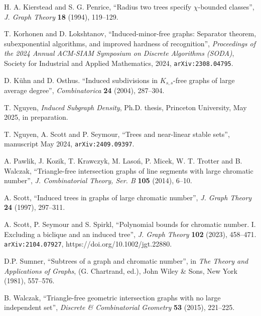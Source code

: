 \documentclass[titlepage,11pt]{article}
\begin{document}
\begin{thebibliography}{99}
 H. A. Kierstead and S. G. Penrice,
``Radius two trees specify $\chi$-bounded classes'',
{\em J. Graph Theory} {\bf 18} (1994), 119--129.

 T. Korhonen and D. Lokshtanov, ``Induced-minor-free graphs: Separator theorem, subexponential
algorithms, and improved hardness of recognition'',  {\em Proceedings of the 2024 Annual ACM-SIAM
Symposium on Discrete Algorithms (SODA)}, Society for Industrial and Applied Mathematics,
2024, {\tt arXiv:2308.04795}.

 D. K\"uhn and  D. Osthus. ``Induced subdivisions in $K_{s,s}$-free graphs of large average degree'', 
{\em Combinatorica} {\bf 24} (2004), 287--304.


 T. Nguyen, {\em Induced Subgraph Density}, Ph.D. thesis, Princeton University, May 2025, in preparation.


 T. Nguyen, A. Scott and P. Seymour, ``Trees and near-linear stable sets'', 
manuscript May 2024, {\tt arXiv:2409.09397}.

 A. Pawlik, J. Kozik, T. Krawczyk, M. Laso\'{n}, P. Micek, W. T. Trotter and B. Walczak,
``Triangle-free intersection graphs of line segments with large chromatic number'',
{\em J. Combinatorial Theory, Ser. B} {\bf 105} (2014), 6--10.


 A. Scott,
``Induced trees in graphs of large chromatic number'',
{\em J. Graph Theory} {\bf 24} (1997), 297--311.

 A. Scott, P. Seymour and  S. Spirkl, ``Polynomial bounds for chromatic
number. I.
Excluding a biclique and an induced tree'', {\em J. Graph Theory} {\bf
102} (2023), 458--471.
{\tt arXiv:2104.07927},  https://doi.org/10.1002/jgt.22880.


D.P. Sumner, ``Subtrees of a graph and chromatic number'', in
{\em The Theory and Applications of Graphs}, (G. Chartrand, ed.),
John Wiley \& Sons, New York (1981), 557--576.

B. Walczak, ``Triangle-free geometric intersection graphs with no large independent set'',
{\em Discrete \& Combinatorial Geometry} {\bf 53} (2015), 221--225.
\end{thebibliography}
\end{document}
